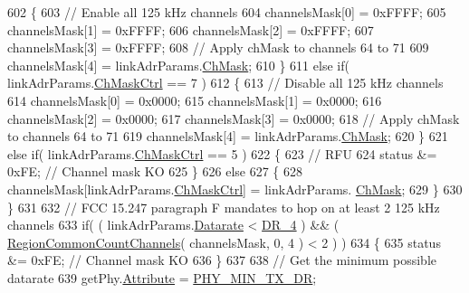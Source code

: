 \begin{DoxyCode}
602         \{
603             \textcolor{comment}{// Enable all 125 kHz channels}
604             channelsMask[0] = 0xFFFF;
605             channelsMask[1] = 0xFFFF;
606             channelsMask[2] = 0xFFFF;
607             channelsMask[3] = 0xFFFF;
608             \textcolor{comment}{// Apply chMask to channels 64 to 71}
609             channelsMask[4] = linkAdrParams.\mbox{\hyperlink{structs_region_common_link_adr_params_adb3d38c312a46e617b1319f97dd56a87}{ChMask}};
610         \}
611         \textcolor{keywordflow}{else} \textcolor{keywordflow}{if}( linkAdrParams.\mbox{\hyperlink{structs_region_common_link_adr_params_ac5e1891f30a172b2ce39bc3498e1843d}{ChMaskCtrl}} == 7 )
612         \{
613             \textcolor{comment}{// Disable all 125 kHz channels}
614             channelsMask[0] = 0x0000;
615             channelsMask[1] = 0x0000;
616             channelsMask[2] = 0x0000;
617             channelsMask[3] = 0x0000;
618             \textcolor{comment}{// Apply chMask to channels 64 to 71}
619             channelsMask[4] = linkAdrParams.\mbox{\hyperlink{structs_region_common_link_adr_params_adb3d38c312a46e617b1319f97dd56a87}{ChMask}};
620         \}
621         \textcolor{keywordflow}{else} \textcolor{keywordflow}{if}( linkAdrParams.\mbox{\hyperlink{structs_region_common_link_adr_params_ac5e1891f30a172b2ce39bc3498e1843d}{ChMaskCtrl}} == 5 )
622         \{
623             \textcolor{comment}{// RFU}
624             status &= 0xFE; \textcolor{comment}{// Channel mask KO}
625         \}
626         \textcolor{keywordflow}{else}
627         \{
628             channelsMask[linkAdrParams.\mbox{\hyperlink{structs_region_common_link_adr_params_ac5e1891f30a172b2ce39bc3498e1843d}{ChMaskCtrl}}] = linkAdrParams.
      \mbox{\hyperlink{structs_region_common_link_adr_params_adb3d38c312a46e617b1319f97dd56a87}{ChMask}};
629         \}
630     \}
631 
632     \textcolor{comment}{// FCC 15.247 paragraph F mandates to hop on at least 2 125 kHz channels}
633     \textcolor{keywordflow}{if}( ( linkAdrParams.\mbox{\hyperlink{structs_region_common_link_adr_params_ae2f6080f3aa0e9485c55513ca56bb24d}{Datarate}} < \mbox{\hyperlink{group___r_e_g_i_o_n_ga6ceba6158a7dab238e9d0b846fb47a0c}{DR\_4}} ) && ( 
      \mbox{\hyperlink{group___r_e_g_i_o_n_c_o_m_m_o_n_gac23f0831812f610f57f42f6cf87368c9}{RegionCommonCountChannels}}( channelsMask, 0, 4 ) < 2 ) )
634     \{
635         status &= 0xFE; \textcolor{comment}{// Channel mask KO}
636     \}
637 
638     \textcolor{comment}{// Get the minimum possible datarate}
639     getPhy.\mbox{\hyperlink{structs_get_phy_params_abdcb168ffd6913b85e2f635d7a475f2d}{Attribute}} = \mbox{\hyperlink{group___r_e_g_i_o_n_gga51cbe8f5433d914fe9cf81b451de2c2daace3e56c88b40def8ed6a9106871e7de}{PHY\_MIN\_TX\_DR}};

\end{DoxyCode}
